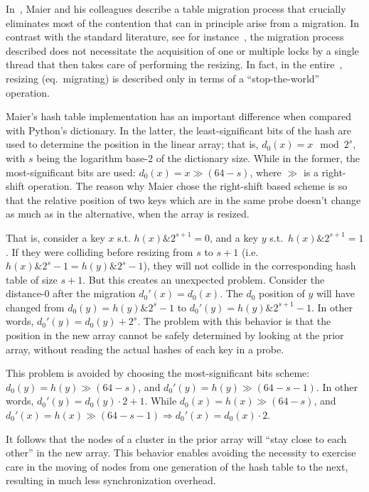 In~\cite{maier}, Maier and his colleagues describe a table migration process that crucially eliminates most of the contention that can in principle arise from a migration.
In contrast with the standard literature, see for instance~\cite[Figure~13.30]{art-mp}, the migration process described does not necessitate the acquisition of one or multiple locks by a single thread that then takes care of performing the resizing.
In fact, in the entire~\cite[Chapter~13]{art-mp}, resizing (eq.\ migrating) is described only in terms of a ``stop-the-world'' operation.

Maier's hash table implementation has an important difference when compared with Python's dictionary.
In the latter, the least-significant bits of the hash are used to determine the position in the linear array; that is, $d_0(x) = x \mod 2^s$, with $s$ being the logarithm base-2 of the dictionary size.
While in the former, the most-significant bits are used: $d_0(x) = x \gg (64 - s)$, where $\gg$ is a right-shift operation.
The reason why Maier chose the right-shift based scheme is so that the relative position of two keys which are in the same probe doesn't change as much as in the alternative, when the array is resized.

That is, consider a key $x$ s.t. $h(x) \mathbin{\&} 2^{s + 1} = 0$, and a key $y$ s.t.\ $h(x) \mathbin{\&} 2^{s + 1} = 1$.
If they were colliding before resizing from $s$ to $s + 1$ (i.e. $h(x) \mathbin{\&} 2^s - 1 = h(y) \mathbin{\&} 2^s - 1$), they will not collide in the corresponding hash table of size $s + 1$.
But this creates an unexpected problem.
Consider the distance-0 after the migration $d_0'(x) = d_0(x)$.
The $d_0$ position of $y$ will have changed from $d_0(y) = h(y) \mathbin{\&} 2^s-1$ to $d_0'(y) = h(y) \mathbin{\&} 2^{s+1}-1$.
In other words, $d_0'(y) = d_0(y) + 2^s$.
The problem with this behavior is that the position in the new array cannot be safely determined by looking at the prior array, without reading the actual hashes of each key in a probe.

This problem is avoided by choosing the most-significant bits scheme: $d_0(y) = h(y) \gg (64 - s)$, and $d_0'(y) = h(y) \gg (64 - s - 1)$.
In other words, $d_0'(y) = d_0(y) \cdot 2 + 1$.
While $d_0(x) = h(x) \gg (64 - s)$, and $d_0'(x) = h(x) \gg (64 - s - 1) \Rightarrow d_0'(x) = d_0(x) \cdot 2$.

It follows that the nodes of a cluster in the prior array will ``stay close to each other'' in the new array.
This behavior enables avoiding the necessity to exercise care in the moving of nodes from one generation of the hash table to the next, resulting in much less synchronization overhead.



